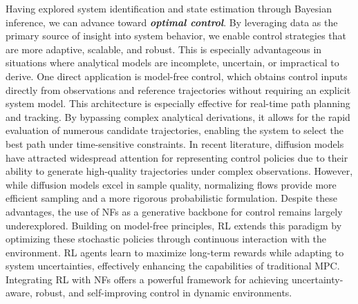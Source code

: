 Having explored system identification and state estimation through Bayesian inference, we can advance toward {\bfseries\itshape optimal control}. By leveraging data as the primary source of insight into system behavior, we enable control strategies that are more adaptive, scalable, and robust. This is especially advantageous in situations where analytical models are incomplete, uncertain, or impractical to derive. One direct application is model-free control, which obtains control inputs directly from observations and reference trajectories without requiring an explicit system model. This architecture is especially effective for real-time path planning and tracking. By bypassing complex analytical derivations, it allows for the rapid evaluation of numerous candidate trajectories, enabling the system to select the best path under time-sensitive constraints. In recent literature, diffusion models have attracted widespread attention for representing control policies due to their ability to generate high-quality trajectories under complex observations. However, while diffusion models excel in sample quality, normalizing flows provide more efficient sampling and a more rigorous probabilistic formulation. Despite these advantages, the use of \acp{NF} as a generative backbone for control remains largely underexplored. Building on model-free principles, \ac{RL} extends this paradigm by optimizing these stochastic policies through continuous interaction with the environment. \ac{RL} agents learn to maximize long-term rewards while adapting to system uncertainties, effectively enhancing the capabilities of traditional \ac{MPC}. Integrating \ac{RL} with \acp{NF} offers a powerful framework for achieving uncertainty-aware, robust, and self-improving control in dynamic environments.

